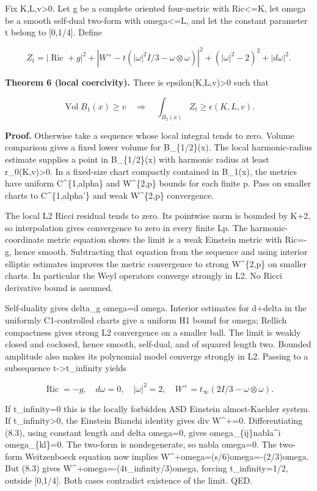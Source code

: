 \documentclass[
  10pt,
]{article}
\begin{document}
Fix K,L,v\textgreater0. Let g be a complete oriented four-metric with
\textbar Ric\textbar\textless=K, let omega be a smooth self-dual
two-form with \textbar omega\textbar\textless=L, and let the constant
parameter t belong to {[}0,1/4{]}. Define

\[
 Z_t=|\operatorname{Ric}+g|^2+
 |W^+-t(|\omega|^2I/3-\omega\otimes\omega)|^2
                  +( |\omega|^2-2)^2+|d\omega|^2.       \tag{8.1}
\]

\textbf{Theorem 6 (local coercivity).} There is
epsilon(K,L,v)\textgreater0 such that

\[
       \operatorname{Vol}B_1(x)\ge v
            \quad\Longrightarrow\quad
       \int_{B_2(x)}Z_t\ge\epsilon(K,L,v).             \tag{8.2}
\]

\textbf{Proof.} Otherwise take a sequence whose local integral tends to
zero. Volume comparison gives a fixed lower volume for B\_\{1/2\}(x).
The local harmonic-radius estimate supplies a point in B\_\{1/2\}(x)
with harmonic radius at least r\_0(K,v)\textgreater0. In a fixed-size
chart compactly contained in B\_1(x), the metrics have uniform
C\^{}\{1,alpha\} and W\^{}\{2,p\} bounds for each finite p. Pass on
smaller charts to C\^{}\{1,alpha'\} and weak W\^{}\{2,p\} convergence.

The local L2 Ricci residual tends to zero. Its pointwise norm is bounded
by K+2, so interpolation gives convergence to zero in every finite Lp.
The harmonic-coordinate metric equation shows the limit is a weak
Einstein metric with Ric=-g, hence smooth. Subtracting that equation
from the sequence and using interior elliptic estimates improves the
metric convergence to strong W\^{}\{2,p\} on smaller charts. In
particular the Weyl operators converge strongly in L2. No Ricci
derivative bound is assumed.

Self-duality gives \textbar delta\_g omega\textbar=\textbar d
omega\textbar. Interior estimates for d+delta in the uniformly
C1-controlled charts give a uniform H1 bound for omega; Rellich
compactness gives strong L2 convergence on a smaller ball. The limit is
weakly closed and coclosed, hence smooth, self-dual, and of squared
length two. Bounded amplitude also makes its polynomial model converge
strongly in L2. Passing to a subsequence t-\textgreater t\_infinity
yields

\[
 \operatorname{Ric}=-g,\quad d\omega=0,\quad |\omega|^2=2,
 \quad W^+=t_\infty(2I/3-\omega\otimes\omega).          \tag{8.3}
\]

If t\_infinity=0 this is the locally forbidden ASD Einstein
almost-Kaehler system. If t\_infinity\textgreater0, the Einstein Bianchi
identity gives div W\^{}+=0. Differentiating (8.3), using constant
length and delta omega=0, gives omega\_\{ij\}nabla\^{}i omega\_\{kl\}=0.
The two-form is nondegenerate, so nabla omega=0. The two-form
Weitzenboeck equation now implies W\^{}+omega=(s/6)omega=-(2/3)omega.
But (8.3) gives W\^{}+omega=-(4t\_infinity/3)omega, forcing
t\_infinity=1/2, outside {[}0,1/4{]}. Both cases contradict existence of
the limit. QED.
\end{document}
